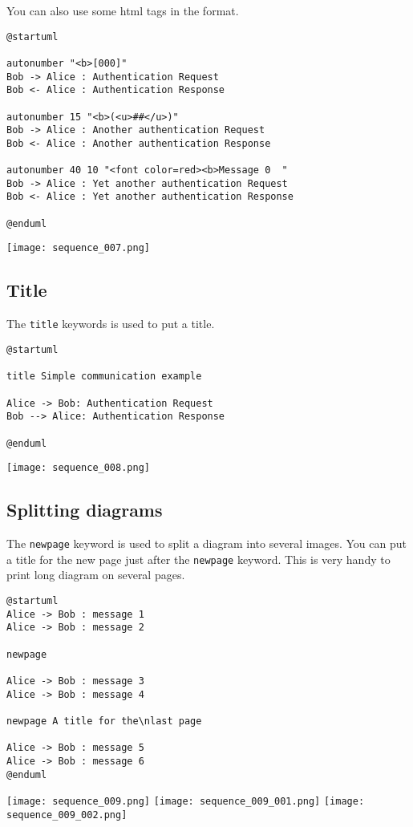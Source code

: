 You can also use some html tags in the format.

\begin{lstlisting}
@startuml

autonumber "<b>[000]"
Bob -> Alice : Authentication Request
Bob <- Alice : Authentication Response

autonumber 15 "<b>(<u>##</u>)"
Bob -> Alice : Another authentication Request
Bob <- Alice : Another authentication Response

autonumber 40 10 "<font color=red><b>Message 0  "
Bob -> Alice : Yet another authentication Request
Bob <- Alice : Yet another authentication Response

@enduml
\end{lstlisting}
\begin{center}
\texttt{[image: sequence\_007.png]}
\end{center}


\newpage \subsection{Title}

The \texttt{title} keywords is used to put a title.
\begin{lstlisting}
@startuml

title Simple communication example

Alice -> Bob: Authentication Request
Bob --> Alice: Authentication Response

@enduml
\end{lstlisting}
\begin{center}
\texttt{[image: sequence\_008.png]}
\end{center}


\newpage \subsection{Splitting diagrams}

The \texttt{newpage} keyword is used to split a diagram into several images.
You can put a title for the new page just after the \texttt{newpage} keyword.
This is very handy to print long diagram on several pages.

\begin{lstlisting}
@startuml
Alice -> Bob : message 1
Alice -> Bob : message 2

newpage

Alice -> Bob : message 3
Alice -> Bob : message 4

newpage A title for the\nlast page

Alice -> Bob : message 5
Alice -> Bob : message 6
@enduml
\end{lstlisting}
\begin{center}
\texttt{[image: sequence\_009.png]}
\vskip 6mm
\texttt{[image: sequence\_009\_001.png]}
\vskip 6mm
\texttt{[image: sequence\_009\_002.png]}
\end{center}
		
